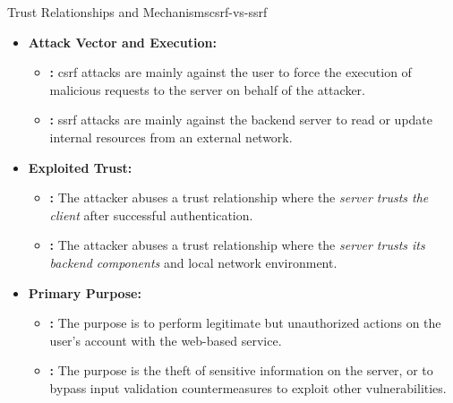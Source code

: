 \begin{concept}{Trust Relationships and Mechanisms}{csrf-vs-ssrf}
    \begin{itemize}
        \item \textbf{Attack Vector and Execution:}
        \begin{itemize}
            \item \textbf{:} \gls{csrf} attacks are mainly against the user to force the execution of malicious requests to the server on behalf of the attacker.
            \item \textbf{:} \gls{ssrf} attacks are mainly against the backend server to read or update internal resources from an external network.
        \end{itemize}
        \item \textbf{Exploited Trust:}
        \begin{itemize}
            \item \textbf{:} The attacker abuses a trust relationship where the \textit{server trusts the client} after successful authentication.
            \item \textbf{:} The attacker abuses a trust relationship where the \textit{server trusts its backend components} and local network environment.
        \end{itemize}
        \item \textbf{Primary Purpose:}
        \begin{itemize}
            \item \textbf{:} The purpose is to perform legitimate but unauthorized actions on the user's account with the web-based service.
            \item \textbf{:} The purpose is the theft of sensitive information on the server, or to bypass input validation countermeasures to exploit other vulnerabilities.
        \end{itemize}
    \end{itemize}
\end{concept}